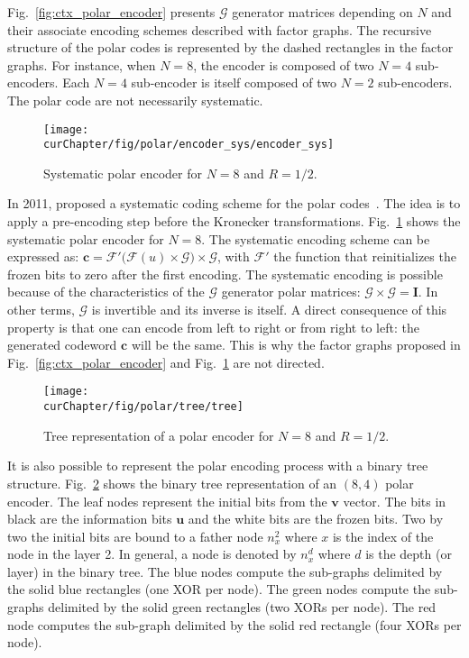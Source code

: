 Fig.~\ref{fig:ctx_polar_encoder} presents $\bm{\mathcal{G}}$ generator
matrices depending on $N$ and their associate encoding schemes described with
factor graphs. The recursive structure of the polar codes is represented by the
dashed rectangles in the factor graphs. For instance, when $N = 8$, the encoder
is composed of two $N = 4$ sub-encoders. Each $N = 4$ sub-encoder is itself
composed of two $N = 2$ sub-encoders. The polar code are not necessarily
systematic.

\begin{figure}[htp]
  \centering
  \texttt{[image: \\curChapter/fig/polar/encoder\_sys/encoder\_sys]}
  \caption{Systematic polar encoder for $N = 8$ and $R = 1/2$.}
  \label{fig:ctx_polar_encoder_sys}
\end{figure}

In 2011, \Arikan proposed a systematic coding scheme for the polar
codes~\cite{Arikan2011}. The idea is to apply a pre-encoding step before the
Kronecker transformations. Fig.~\ref{fig:ctx_polar_encoder_sys} shows the
systematic polar encoder for $N = 8$. The systematic encoding scheme can be
expressed as: $\bm{c} = \mathcal{F'}\big(\mathcal{F}(u) \times
\bm{\mathcal{G}}\big) \times \bm{\mathcal{G}}$, with $\mathcal{F'}$ the function
that reinitializes the frozen bits to zero after the first encoding. The
systematic encoding is possible because of the characteristics of the
$\bm{\mathcal{G}}$ generator polar matrices: $\bm{\mathcal{G}} \times
\bm{\mathcal{G}} = \bm{I}$. In other terms, $\bm{\mathcal{G}}$ is invertible and
its inverse is itself. A direct consequence of this property is that one can
encode from left to right or from right to left: the generated codeword $\bm{c}$
will be the same. This is why the factor graphs proposed in
Fig.~\ref{fig:ctx_polar_encoder} and Fig.~\ref{fig:ctx_polar_encoder_sys} are
not directed.

\begin{figure}[htp]
  \centering
  \texttt{[image: \\curChapter/fig/polar/tree/tree]}
  \caption{Tree representation of a polar encoder for $N = 8$ and $R = 1/2$.}
  \label{fig:ctx_polar_tree}
\end{figure}

It is also possible to represent the polar encoding process with a binary tree
structure. Fig.~\ref{fig:ctx_polar_tree} shows the binary tree representation of
an $(8,4)$ polar encoder. The leaf nodes represent the initial bits from the
$\bm{v}$ vector. The bits in black are the information bits $\bm{u}$ and the
white bits are the frozen bits. Two by two the initial bits are bound to a
father node $n_x^2$ where $x$ is the index of the node in the layer 2. In
general, a node is denoted by $n_x^d$ where $d$ is the depth (or layer) in the
binary tree. The {\color{Paired-1} blue} nodes compute the sub-graphs delimited
by the solid {\color{Paired-1} blue} rectangles (one XOR per node). The
{\color{Paired-3} green} nodes compute the sub-graphs delimited by the solid
{\color{Paired-3} green} rectangles (two XORs per node). The {\color{Paired-5}
red} node computes the sub-graph delimited by the solid {\color{Paired-5} red}
rectangle (four XORs per node).

